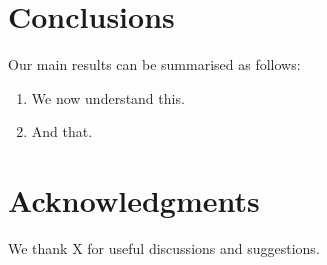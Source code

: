 \documentclass[useAMS,usenatbib]{mn2e}
\begin{document}

\section{Conclusions}
\label{sec:concl}

Our main results can be summarised as follows:

\begin{enumerate}

\item We now understand this.

\item And that.

\end{enumerate}



\section*{Acknowledgments}
 
We thank X for useful discussions and suggestions.











\label{lastpage}
\bsp
\end{document}
